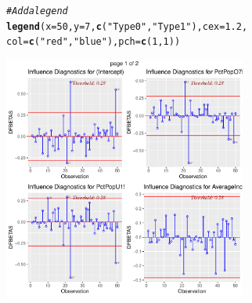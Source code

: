 \documentclass{article}\usepackage[]{graphicx}\usepackage[]{color}
\makeatletter
\newcommand{\hlnum}[1]{\textcolor[rgb]{0.686,0.059,0.569}{#1}}%
\newcommand{\hlstr}[1]{\textcolor[rgb]{0.192,0.494,0.8}{#1}}%
\newcommand{\hlcom}[1]{\textcolor[rgb]{0.678,0.584,0.686}{\textit{#1}}}%
\newcommand{\hlstd}[1]{\textcolor[rgb]{0.345,0.345,0.345}{#1}}%
\newcommand{\hlkwc}[1]{\textcolor[rgb]{0.333,0.667,0.333}{#1}}%
\newcommand{\hlkwd}[1]{\textcolor[rgb]{0.737,0.353,0.396}{\textbf{#1}}}%
\newenvironment{kframe}{%
 \def\at@end@of@kframe{}%
 \ifinner\ifhmode%
  \def\at@end@of@kframe{\end{minipage}}%
  \begin{minipage}{\columnwidth}%
 \fi\fi%
 \def\FrameCommand##1{\hskip\@totalleftmargin \hskip-\fboxsep
 \colorbox{shadecolor}{##1}\hskip-\fboxsep
     \hskip-\linewidth \hskip-\@totalleftmargin \hskip\columnwidth}%
 \MakeFramed {\advance\hsize-\width
   \@totalleftmargin\z@ \linewidth\hsize
   \@setminipage}}%
 {\par\unskip\endMakeFramed%
 \at@end@of@kframe}
\newenvironment{knitrout}{}{} %
\makeatother
\begin{document}
\begin{knitrout}
\begin{kframe}
\begin{alltt}
\hlcom{# Add a legend}
\hlkwd{legend}\hlstd{(}\hlkwc{x} \hlstd{=} \hlnum{50}\hlstd{,} \hlkwc{y} \hlstd{=} \hlnum{7}\hlstd{,} \hlkwd{c}\hlstd{(}\hlstr{"Type 0"}\hlstd{,}\hlstr{"Type 1"}\hlstd{),} \hlkwc{cex} \hlstd{=} \hlnum{1.2}\hlstd{,}
       \hlkwc{col} \hlstd{=} \hlkwd{c}\hlstd{(}\hlstr{"red"}\hlstd{,} \hlstr{"blue"}\hlstd{),} \hlkwc{pch} \hlstd{=} \hlkwd{c}\hlstd{(}\hlnum{1}\hlstd{,}\hlnum{1}\hlstd{))}
\end{alltt}
\end{kframe}

{\centering \includegraphics[width=0.6\textwidth]{figure/unnamed-chunk-5-1} 

}



\end{knitrout}
\end{document}

